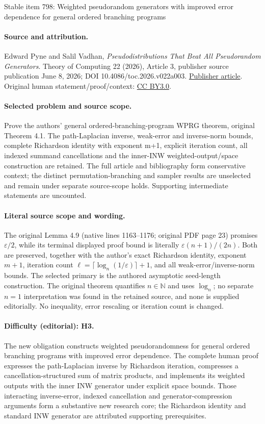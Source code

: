 \documentclass[11pt]{article}
\numberwithin{equation}{section}
\theoremstyle{definition}
\theoremstyle{plain}
\newcommand{\N}{\mathbb N}
\newcommand{\eps}{\varepsilon}
\begin{document}
\begin{center}{\Large Stable item 798: Weighted pseudorandom generators with improved error dependence for general ordered branching programs}\end{center}
\paragraph{Source and attribution.}
Edward Pyne and Salil Vadhan, \emph{Pseudodistributions That Beat All Pseudorandom Generators}. Theory of Computing 22 (2026), Article 3, publisher source publication June 8, 2026; DOI 10.4086/toc.2026.v022a003. \href{https://theoryofcomputing.org/articles/v022a003/}{Publisher article}. Original human statement/proof/context: \href{https://creativecommons.org/licenses/by/3.0/}{CC BY3.0}.
\paragraph{Selected problem and source scope.}
Prove the authors' general ordered-branching-program WPRG theorem, original Theorem 4.1. The path-Laplacian inverse, weak-error and inverse-norm bounds, complete Richardson identity with exponent m+1, explicit iteration count, all indexed summand cancellations and the inner-INW weighted-output/space construction are retained. The full article and bibliography form conservative context; the distinct permutation-branching and sampler results are unselected and remain under separate source-scope holds. Supporting intermediate statements are uncounted.
\paragraph{Literal source scope and wording.}
The original Lemma 4.9 (native lines 1163–1176; original PDF page 23) promises \(\eps/2\), while its terminal displayed proof bound is literally \(\eps(n+1)/(2n)\). Both are preserved, together with the author's exact Richardson identity, exponent \(m+1\), iteration count \(\ell=\lceil\log_n(1/\eps)\rceil+1\), and all weak-error/inverse-norm bounds. The selected primary is the authored asymptotic seed-length construction. The original theorem quantifies \(n\in\N\) and uses \(\log_n\); no separate \(n=1\) interpretation was found in the retained source, and none is supplied editorially. No inequality, error rescaling or iteration count is changed.
\paragraph{Difficulty (editorial): H3.}
The new obligation constructs weighted pseudorandomness for general ordered branching programs with improved error dependence. The complete human proof expresses the path-Laplacian inverse by Richardson iteration, compresses a cancellation-structured sum of matrix products, and implements its weighted outputs with the inner INW generator under explicit space bounds. Those interacting inverse-error, indexed cancellation and generator-compression arguments form a substantive new research core; the Richardson identity and standard INW generator are attributed supporting prerequisites.
\end{document}
